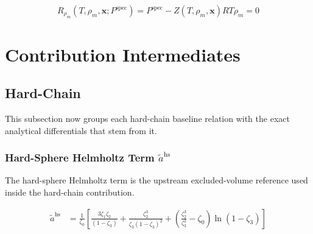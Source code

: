 \documentclass[12pt, letterpaper]{article}
\begin{document}
\begin{equation}
    R_{\rho_m}\!\left(T,\rho_m,\mathbf{x};P^{\mathrm{spec}}\right)
    =
    P^{\mathrm{spec}}
    -
    Z(T,\rho_m,\mathbf{x})RT\rho_m
    =
    0
    \label{eq:density_solve_residual}
\end{equation}

\section{Contribution Intermediates}
\label{sec:contribution_intermediates}

\subsection{Hard-Chain}
\label{sec:hard_chain}

This subsection now groups each hard-chain baseline relation with the exact analytical differentials that stem from it.

\subsubsection{Hard-Sphere Helmholtz Term \texorpdfstring{\(\tilde{a}^{\mathrm{hs}}\)}{a_hs}}

The hard-sphere Helmholtz term is the upstream excluded-volume reference used inside the hard-chain contribution.

\begin{equation}
    \begin{aligned}
        \tilde{a}^{\mathrm{hs}}
        &=
        \frac{1}{\zeta_{0}}
        \left[
            \frac{3 \zeta_{1} \zeta_{2}}{\left(1-\zeta_{3}\right)}
            +\frac{\zeta_{2}^3}{\zeta_{3}\left(1-\zeta_{3}\right)^2}
            +\left(\frac{\zeta_{2}^3}{\zeta_{3}^2}-\zeta_{0}\right) \ln \left(1-\zeta_{3}\right)
        \right]
    \end{aligned}
    \label{eq:ares_hs}
\end{equation}

\end{document}

